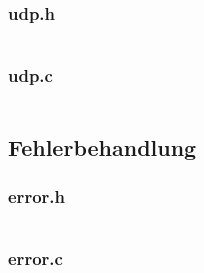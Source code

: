 \begin{landscape}
\begin{multicols}{2}
		\subsubsection*{udp.h}
		\inputminted[fontsize=\scriptsize,linenos,tabsize=4]{c}{./code/daemon/src/udp.h}

		\subsubsection*{udp.c}
		\inputminted[fontsize=\scriptsize,linenos,tabsize=4]{c}{./code/daemon/src/udp.c}

		\subsection*{Fehlerbehandlung}
		\subsubsection*{error.h}
		\inputminted[fontsize=\scriptsize,linenos,tabsize=4]{c}{./code/daemon/src/error.h}

		\subsubsection*{error.c}
		\inputminted[fontsize=\scriptsize,linenos,tabsize=4]{c}{./code/daemon/src/error.c}

		
	\end{multicols}
\end{landscape}
